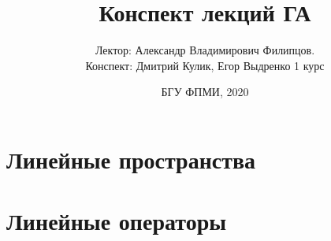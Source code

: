 \documentclass[12pt,a4paper,oneside]{report}
\title{Конспект лекций ГА}
\author{Лектор: Александр Владимирович Филипцов.\\Конспект: Дмитрий Кулик, Егор Выдренко 1 курс}
\date{БГУ ФПМИ, 2020}
\begin{document}
\maketitle
\tableofcontents
\chapter{Линейные пространства}

\chapter{Линейные операторы}



\end{document}

